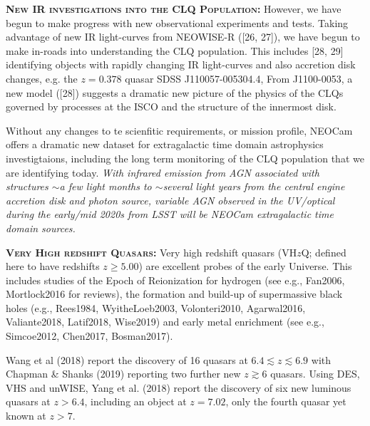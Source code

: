 \documentclass[12pt]{article}
\begin{document}
\smallskip
\smallskip
\noindent
\textbf{\textsc{New IR investigations into the CLQ Population:}}
However, we have begun to make progress with new
observational experiments and tests.  Taking advantage of new IR
light-curves from NEOWISE-R ([26, 27]), we have begun to make in-roads
into understanding the CLQ population.  This includes [28, 29]
identifying objects with rapidly changing IR light-curves and also
accretion disk changes, e.g. the $z=0.378$ quasar SDSS
J110057-005304.4, 
From J1100-0053, a new model ([28]) suggests a dramatic new picture of the physics of the
CLQs governed by processes at the ISCO and the structure of the
innermost disk.  



\smallskip
\smallskip
\noindent
Without any changes to te scienfitic requirements, or mission profile, NEOCam offers 
a dramatic new dataset for extragalactic time domain astrophysics investigtaions, including
the long term monitoring of the CLQ population that we are identifying today.
{\it With infrared emission from AGN associated with structures $\sim$a few light months to $\sim$several light years from the central engine accretion disk and photon source, variable AGN observed in the UV/optical during the early/mid 2020s from LSST will be NEOCam extragalactic time domain sources.}


\smallskip
\smallskip
\noindent
\textbf{\textsc{Very High redshift Quasars:}} 
Very high redshift quasars (VH$z$Q; defined here to have redshifts $z\geq5.00$) are excellent probes of the early Universe. This includes studies of the Epoch of Reionization for hydrogen (see e.g., Fan2006, Mortlock2016 for reviews), the formation and build-up of supermassive black holes (e.g., Rees1984, WyitheLoeb2003, Volonteri2010, Agarwal2016, Valiante2018, Latif2018, Wise2019) and early metal enrichment (see e.g., Simcoe2012, Chen2017, Bosman2017).

\smallskip
\smallskip
\noindent
Wang et al (2018) 
report the discovery of 16 quasars at $6.4\lesssim z \lesssim 6.9$ 
with Chapman \& Shanks (2019) reporting two further new $z\gtrsim6$ quasars. 
Using DES, VHS and unWISE, Yang et al. (2018) report the discovery of six new luminous quasars at $z > 6.4$, 
including an object at $z = 7.02$, only the fourth quasar yet known at $z > 7$. 
\end{document}
